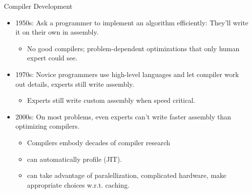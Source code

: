 \begin{frame}{Compiler Development}
  \begin{itemize}
    \item 1950s: Ask a programmer to implement an algorithm efficiently:  They'll write it on their own in assembly.
    \begin{itemize}
      \item No good compilers; problem-dependent optimizations that only human expert could see.
    \end{itemize}
    \vspace{\baselineskip}
    \item 1970s: Novice programmers use high-level languages and let compiler work out details, experts still write assembly.
    \begin{itemize}
      \item Experts still write custom assembly when speed critical.
    \end{itemize}
    \vspace{\baselineskip}
    \item 2000s: On most problems, even experts can't write faster assembly than optimizing compilers.
    \begin{itemize}
      \item Compilers embody decades of compiler research
      \item can automatically profile (JIT).
      \item can take advantage of paralellization, complicated hardware, make appropriate choices w.r.t. caching.
    \end{itemize}    
    \vspace{\baselineskip}
  \end{itemize}
\end{frame}


